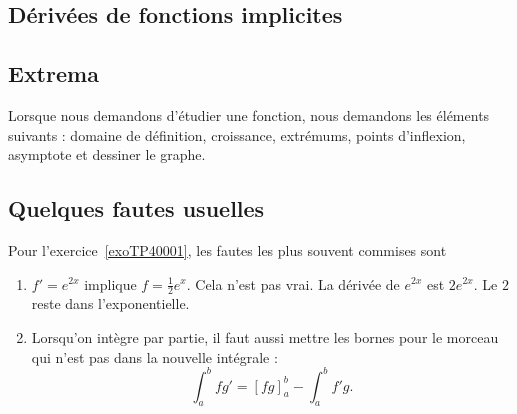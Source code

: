 \subsection{Dérivées de fonctions implicites}

\subsection{Extrema}


Lorsque nous demandons d'étudier une fonction, nous demandons les éléments suivants : domaine de définition, croissance, extrémums, points d'inflexion, asymptote et dessiner le graphe.



\subsection{Quelques fautes usuelles}

Pour l'exercice~\ref{exoTP40001}, les fautes les plus souvent commises sont
\begin{enumerate}

	\item
		$f'= e^{2x}$ implique $f=\frac{1}{ 2 } e^{x}$. Cela n'est pas vrai. La dérivée de $ e^{2x}$ est $2 e^{2x}$. Le $2$ reste dans l'exponentielle.

	\item
		Lorsqu'on intègre par partie, il faut aussi mettre les bornes pour le morceau qui n'est pas dans la nouvelle intégrale :
		\begin{equation}
			\int_a^b fg'=[fg]_a^b-\int_a^bf'g.
		\end{equation}
\end{enumerate}

